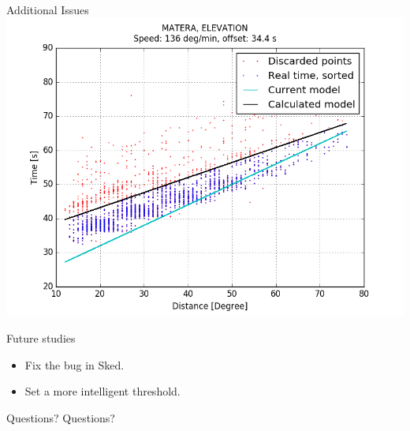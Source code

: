 \documentclass{beamer}
\begin{document}
    \begin{frame}{Additional Issues}
        \centering
        \includegraphics[width=1\columnwidth]{ma_el}
    \end{frame}
    \begin{frame}{Future studies}
        \begin{itemize}[<+-|alert@+>]
            \item Fix the bug in Sked.
            \item Set a more intelligent threshold.
        \end{itemize}
    \end{frame}
    \begin{frame}{Questions?}
        \centering
        Questions?
    \end{frame}
\end{document}

